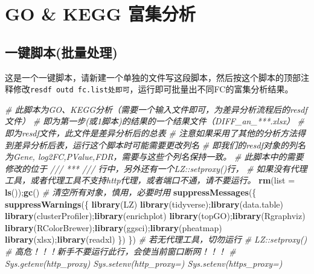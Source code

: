 \documentclass[
]{book}
\newenvironment{Shaded}{\begin{snugshade}}{\end{snugshade}}
\newcommand{\AttributeTok}[1]{\textcolor[rgb]{0.13,0.29,0.53}{#1}}
\newcommand{\CommentTok}[1]{\textcolor[rgb]{0.56,0.35,0.01}{\textit{#1}}}
\newcommand{\FunctionTok}[1]{\textcolor[rgb]{0.13,0.29,0.53}{\textbf{#1}}}
\newcommand{\NormalTok}[1]{#1}
\begin{document}
\hypertarget{enrich-auto}{%
\section{GO \& KEGG 富集分析}\label{enrich-auto}}

\hypertarget{ux4e00ux952eux811aux672cux6279ux91cfux5904ux7406}{%
\subsection{一键脚本(批量处理)}\label{ux4e00ux952eux811aux672cux6279ux91cfux5904ux7406}}

这是一个一键脚本，请新建一个单独的文件写这段脚本，然后按这个脚本的顶部注释修改\texttt{resdf\ outd\ fc.list处即可}，运行即可批量出不同FC的富集分析结果。

\begin{Shaded}
\begin{Highlighting}[]
\CommentTok{\# 此脚本为GO、KEGG分析（需要一个输入文件即可，为差异分析流程后的resdf文件）}
\CommentTok{\# 即为第一步(或1脚本)的结果的一个结果文件（DIFF\_an\_***.xlsx）}
\CommentTok{\# 即为resdf文件，此文件是差异分析后的总表}
\CommentTok{\# 注意如果采用了其他的分析方法得到差异分析后表，运行这个脚本时可能需要更改列名}
\CommentTok{\# 即我们的resdf对象的列名为Gene, log2FC,PValue,FDR，需要与这些个列名保持一致。}
\CommentTok{\# 此脚本中的需要修改的位于 /// *** /// 行中，另外还有一个LZ::setproxy()行，}
\CommentTok{\#   如果没有代理工具，或者代理工具不支持http代理，或者端口不通，请不要运行。}
\FunctionTok{rm}\NormalTok{(}\AttributeTok{list =} \FunctionTok{ls}\NormalTok{());}\FunctionTok{gc}\NormalTok{() }\CommentTok{\# 清空所有对象，慎用，必要时用}
\FunctionTok{suppressMessages}\NormalTok{(\{ }\FunctionTok{suppressWarnings}\NormalTok{(\{}
  \FunctionTok{library}\NormalTok{(LZ)}
  \FunctionTok{library}\NormalTok{(tidyverse);}\FunctionTok{library}\NormalTok{(data.table)}
  \FunctionTok{library}\NormalTok{(clusterProfiler);}\FunctionTok{library}\NormalTok{(enrichplot)}
  \FunctionTok{library}\NormalTok{(topGO);}\FunctionTok{library}\NormalTok{(Rgraphviz)}
  \FunctionTok{library}\NormalTok{(RColorBrewer);}\FunctionTok{library}\NormalTok{(ggsci);}\FunctionTok{library}\NormalTok{(pheatmap)}
  \FunctionTok{library}\NormalTok{(xlsx);}\FunctionTok{library}\NormalTok{(readxl)}
\NormalTok{\}) \})}
\CommentTok{\# 若无代理工具，切勿运行 }
\CommentTok{\# LZ::setproxy() \# 高危！！！新手不要运行此行，会使当前窗口断网！！！}
\CommentTok{\# Sys.getenv(\textquotesingle{}http\_proxy\textquotesingle{}) Sys.setenv(\textquotesingle{}http\_proxy\textquotesingle{}=\textquotesingle{}\textquotesingle{}) Sys.setenv(\textquotesingle{}https\_proxy\textquotesingle{}=\textquotesingle{}\textquotesingle{})}




\end{Highlighting}
\end{Shaded}
\end{document}
